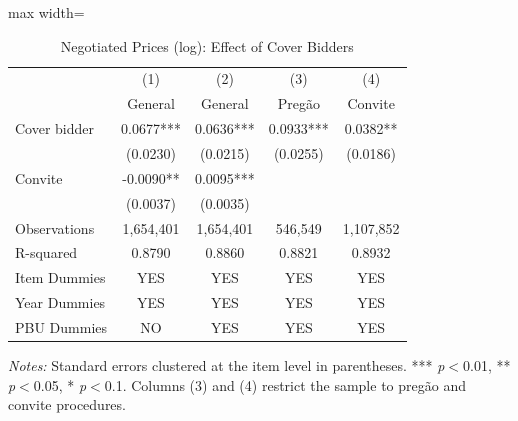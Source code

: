 \begin{table}[htbp]
\centering
\caption{Negotiated Prices (log): Effect of Cover Bidders}
\label{tab:prices}
\begin{adjustbox}{max width=\textwidth}
\begin{threeparttable}
\small
\begin{tabular}{lcccc}
\toprule
 & (1) & (2) & (3) & (4) \\
 & General & General & Preg\~{a}o & Convite \\
\midrule
Cover bidder & 0.0677*** & 0.0636*** & 0.0933*** & 0.0382** \\
 & (0.0230) & (0.0215) & (0.0255) & (0.0186) \\
Convite & -0.0090** & 0.0095*** &  &  \\
 & (0.0037) & (0.0035) &  &  \\
\midrule
Observations & 1,654,401 & 1,654,401 & 546,549 & 1,107,852 \\
R-squared & 0.8790 & 0.8860 & 0.8821 & 0.8932 \\
Item Dummies & YES & YES & YES & YES \\
Year Dummies & YES & YES & YES & YES \\
PBU Dummies & NO & YES & YES & YES \\
\bottomrule
\end{tabular}
\begin{tablenotes}
\small
\item \textit{Notes:} Standard errors clustered at the item level in parentheses. *** \textit{p}$<$0.01, ** \textit{p}$<$0.05, * \textit{p}$<$0.1. Columns (3) and (4) restrict the sample to preg\~{a}o and convite procedures.
\end{tablenotes}
\end{threeparttable}
\end{adjustbox}
\end{table}

